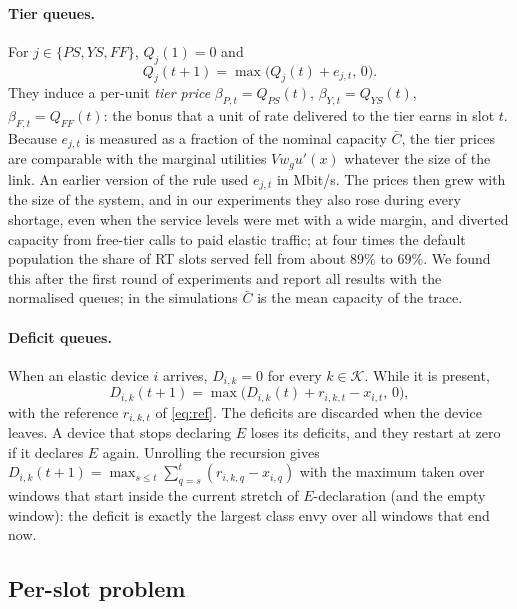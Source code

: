 \documentclass[preprint,11pt]{elsarticle}
\theoremstyle{definition}
\theoremstyle{remark}
\newcommand{\cK}{\mathcal{K}}
\begin{document}
\paragraph{Tier queues.}
For $j\in\{PS,YS,FF\}$, $Q_j(1)=0$ and
\begin{equation}\label{eq:Q}
Q_j(t+1)=\max\big(Q_j(t)+e_{j,t},\,0\big).
\end{equation}
They induce a per-unit \emph{tier price} $\beta_{P,t}=Q_{PS}(t)$, $\beta_{Y,t}=Q_{YS}(t)$, $\beta_{F,t}=Q_{FF}(t)$: the bonus that a unit of rate delivered to the tier earns in slot $t$.
Because $e_{j,t}$ is measured as a fraction of the nominal capacity $\bar C$, the tier prices are comparable with the marginal utilities $Vw_gu'(x)$ whatever the size of the link.
An earlier version of the rule used $e_{j,t}$ in Mbit/s. The prices then grew with the size of the system, and in our experiments they also rose during every shortage, even when the service levels were met with a wide margin, and diverted capacity from free-tier calls to paid elastic traffic; at four times the default population the share of RT slots served fell from about $89\%$ to $69\%$. We found this after the first round of experiments and report all results with the normalised queues; in the simulations $\bar C$ is the mean capacity of the trace.

\paragraph{Deficit queues.}
When an elastic device $i$ arrives, $D_{i,k}=0$ for every $k\in\cK$. While it is present,
\begin{equation}\label{eq:D}
D_{i,k}(t+1)=\max\big(D_{i,k}(t)+r_{i,k,t}-x_{i,t},\,0\big),
\end{equation}
with the reference $r_{i,k,t}$ of \eqref{eq:ref}. The deficits are discarded when the device leaves.
A device that stops declaring $E$ loses its deficits, and they restart at zero if it declares $E$ again.
Unrolling the recursion gives $D_{i,k}(t+1)=\max_{s\le t}\sum_{q=s}^{t}(r_{i,k,q}-x_{i,q})$ with the maximum taken over windows that start inside the current stretch of $E$-declaration (and the empty window): the deficit is exactly the largest class envy over all windows that end now.

\subsection{Per-slot problem}
\end{document}
